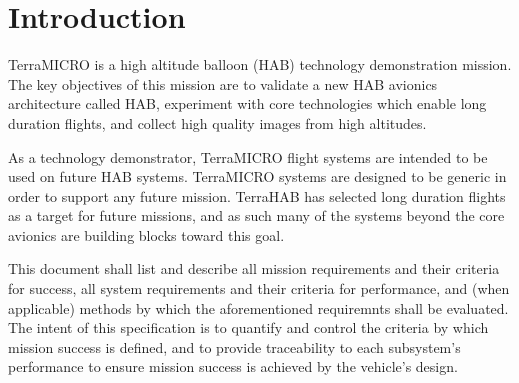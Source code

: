 \section{Introduction}

TerraMICRO is a high altitude balloon (HAB) technology demonstration mission.
The key objectives of this mission are to validate a new HAB avionics 
architecture called \textmu HAB, experiment with core technologies which enable 
long duration flights, and collect high quality images from high altitudes.

As a technology demonstrator, TerraMICRO flight systems are intended
to be used on future HAB systems. TerraMICRO systems are designed to be
generic in order to support any future mission. TerraHAB has selected long
duration flights as a target for future missions, and as such many of the 
systems beyond the core avionics are building blocks toward this goal.
    
This document shall list and describe all mission requirements and their 
criteria for success, all system requirements and their criteria for 
performance, and (when applicable) methods by which the aforementioned 
requiremnts shall be evaluated. The intent of this specification is to quantify and control the criteria
by which mission success is defined, and to provide traceability to each
subsystem's performance to ensure mission success is achieved by the 
vehicle's design.
